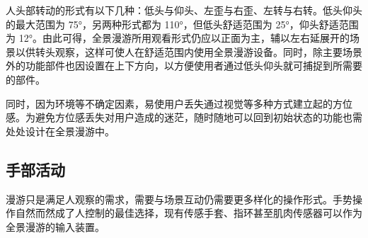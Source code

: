 人头部转动的形式有以下几种：低头与仰头、左歪与右歪、左转与右转。低头仰头的最大范围为 75°，另两种形式都为 110°，但低头舒适范围为 25°，仰头舒适范围为 12°。由此可得，全景漫游所用观看形式仍应以正面为主，辅以左右延展开的场景以供转头观察，这样可使人在舒适范围内使用全景漫游设备。同时，除主要场景外的功能部件也因设置在上下方向，以方便使用者通过低头仰头就可捕捉到所需要的部件。

同时，因为环境等不确定因素，易使用户丢失通过视觉等多种方式建立起的方位感。为避免方位感丢失对用户造成的迷茫，随时随地可以回到初始状态的功能也需处处设计在全景漫游中。

\subsection{手部活动}

漫游只是满足人观察的需求，需要与场景互动仍需要更多样化的操作形式。手势操作自然而然成了人控制的最佳选择，现有传感手套、指环甚至肌肉传感器可以作为全景漫游的输入装置。